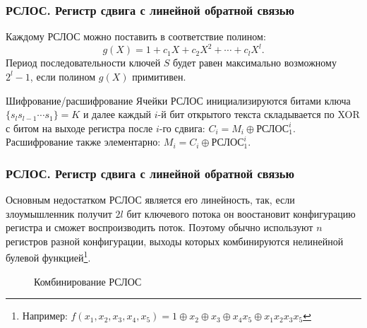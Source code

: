 \begin{frame}
    \frametitle{РСЛОС. Регистр сдвига с \alert{линейной} обратной связью}
    
    Каждому РСЛОС можно поставить в соответствие полином:
    \[g(X)=1+c_1X+c_2X^2+\cdots+c_lX^l.\]
    Период последовательности ключей $S$ будет равен максимально возможному $2^l-1$, если полином $g(X)$ \alert{примитивен}.
    
    \begin{block}{Шифрование/расшифрование}
    Ячейки РСЛОС инициализируются битами ключа $\{s_ls_{l-1}\cdots s_1\}=K$ и далее каждый $i$-й бит открытого текста складывается по XOR с битом на выходе регистра после $i$-го сдвига: $C_i=M_i\oplus\text{РСЛОС}_1^i$. Расшифрование также элементарно: $M_i=C_i\oplus\text{РСЛОС}_1^i$.
    \end{block}
\end{frame}


\begin{frame}
    \frametitle{РСЛОС. Регистр сдвига с \alert{линейной} обратной связью}

    Основным недостатком РСЛОС является его линейность, так, если злоумышленник получит $2l$ бит ключевого потока он воостановит конфигурацию регистра и сможет воспроизводить поток. Поэтому обычно используют $n$ регистров разной конфигурации, выходы которых комбинируются нелинейной булевой функцией\footnote{Например: $f(x_1,x_2,x_3,x_4,x_5)=1\oplus x_2\oplus x_3 \oplus x_4x_5 \oplus x_1x_2x_3x_5$}.
    \begin{figure}
        \begin{center}
        \end{center}
        \caption{Комбинирование РСЛОС}\label{pict:lfsrMix}
    \end{figure} 
\end{frame}


